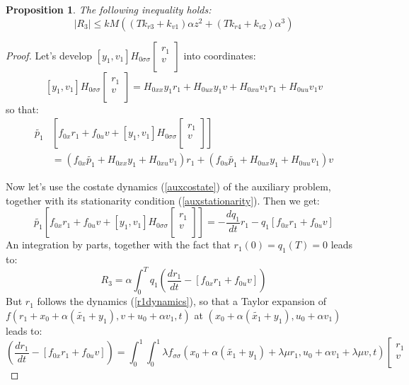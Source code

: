 \documentclass[a4paper,10pt]{article}
\newtheorem{proposition}{Proposition}
\begin{document}
\begin{proposition}
    The following inequality holds:
    \begin{equation}
        |R_{3}| \leq kM\left((Tk_{r3}+k_{v1})\alpha z^{2}
	+(Tk_{r4}+k_{v2}) \alpha^{3}\right)
        \label{R3bound}
    \end{equation}
\end{proposition}
\begin{proof}
    Let's develop $\left[y_{1},v_{1}\right]
	H_{0 \sigma \sigma}
	 \left[
	\begin{array}
	{c}
	    r_{1}  \\
	    v  \\
	\end{array}
	\right]$ into coordinates:
	\[
	    \left[y_{1},v_{1}\right]
	H_{0 \sigma \sigma}
	 \left[
	\begin{array}
	{c}
	    r_{1}  \\
	    v  \\
	\end{array}
	\right]
	=H_{0xx}y_{1}r_{1} + H_{0ux}y_{1}v + H_{0xu}v_{1}r_{1} + 
	H_{0uu}v_{1}v
	\]
	so that:
	\begin{align*}
	    \tilde{p_{1}}&\left[f_{0x}r_{1} + f_{0u}v
	 + \left[y_{1},v_{1}\right]
	H_{0 \sigma \sigma}
	 \left[
	\begin{array}
	{c}
	    r_{1}  \\
	    v  \\
	\end{array}
	\right]\right]\\
	& =(f_{0x}\tilde{p_{1}}+H_{0xx}y_{1} + H_{0xu}v_{1}) r_{1}
	+ (f_{0u}\tilde{p_{1}}+H_{0ux}y_{1} + H_{0uu}v_{1}) v
	\end{align*}
	
Now let's use the costate dynamics (\ref{auxcostate}) of the 
auxiliary problem, together with its stationarity condition 
(\ref{auxstationarity}). Then we get:
\[
   \tilde{p_{1}}\left[f_{0x}r_{1} + f_{0u}v
	 + \left[y_{1},v_{1}\right]
	H_{0 \sigma \sigma}
	 \left[
	\begin{array}
	{c}
	    r_{1}  \\
	    v  \\
	\end{array}
	\right]\right]
	= -\frac{dq_{1}}{dt}r_{1} - q_{1}\left[f_{0x}r_{1} + f_{0u}v\right]
\]
An integration by parts, together with the fact that 
$r_{1}(0)=q_{1}(T)=0$ leads to:
\[
    R_{3}= \alpha \int_{0}^{T} q_{1}\left(\frac{dr_{1}}{dt}-\left[f_{0x}r_{1} + f_{0u}v\right]\right)
\]
But $r_{1}$ follows the dynamics (\ref{r1dynamics}), so that a Taylor 
expansion of 
$f(r_{1}+x_{0}+\alpha(\tilde{x_{1}}+y_{1}),v+u_{0}+\alpha v_{1},t)$ 
at $(x_{0}+\alpha(\tilde{x_{1}}+y_{1}),u_{0}+\alpha v_{1})$ leads to:
\[
  \left(\frac{dr_{1}}{dt}-\left[f_{0x}r_{1} + f_{0u}v\right]\right)
  = \int_{0}^{1} \int_{0}^{1} \lambda
  f_{\sigma\sigma}(x_{0}+\alpha(\tilde{x_{1}}+y_{1}) + \lambda\mu r_{1},
  u_{0}+\alpha v_{1} + \lambda\mu v,t)
  \left[
  \begin{array}
  {c}
       r_{1} \\
       v  \\
      

\end{array}\]
\end{proof}
\end{document}
